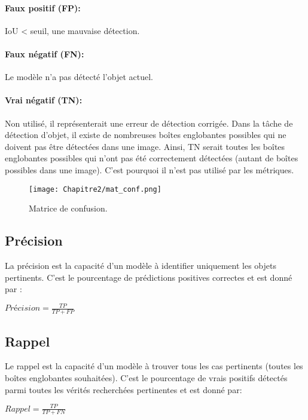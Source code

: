           \paragraph{Faux positif (FP):} IoU < seuil, une mauvaise détection.
          \paragraph{Faux négatif (FN):} Le modèle n'a pas détecté l'objet actuel.
          \paragraph{Vrai négatif (TN):} Non utilisé, il représenterait une erreur de détection corrigée. Dans la tâche de détection d'objet, il existe de nombreuses boîtes englobantes possibles qui ne doivent pas être détectées dans une image. Ainsi, TN serait toutes les boîtes englobantes possibles qui n'ont pas été correctement détectées (autant de boîtes possibles dans une image). C'est pourquoi il n'est pas utilisé par les métriques.
          \begin{figure}[H]
               \centering
               \texttt{[image: Chapitre2/mat\_conf.png]}
               \caption{Matrice de confusion.}
               \label{mat_conf}
               \end{figure}
          
          \subsection{Précision}
          La précision est la capacité d'un modèle à identifier uniquement les objets pertinents. C'est le pourcentage de prédictions positives correctes et est donné par :
          \begin{center} $Précision = \frac{TP}{TP + FP}$ \end{center}

          \subsection{Rappel}
          Le rappel est la capacité d'un modèle à trouver tous les cas pertinents (toutes les boîtes englobantes souhaitées). C'est le pourcentage de vrais positifs détectés parmi toutes les vérités recherchées pertinentes et est donné par:
          \begin{center} $Rappel = \frac{TP}{TP + FN}$ \end{center}
          
